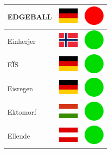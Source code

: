 \documentclass[12pt, a4paper, twoside]{report}
\begin{document}
\begin{center}
\begin{longtable}{|p{5cm}|p{2cm}|p{2cm}|}
 EDGEBALL                                                   & \includegraphics[width=1cm]{../img/flags/de} &   \includegraphics[width=1cm]{../likes/n} \\ \hline
 Einherjer                                                  & \includegraphics[width=1cm]{../img/flags/no} &   \includegraphics[width=1cm]{../likes/y} \\ \hline
 EÏS                                                        & \includegraphics[width=1cm]{../img/flags/de} &   \includegraphics[width=1cm]{../likes/y} \\ \hline
 Eisregen                                                   & \includegraphics[width=1cm]{../img/flags/de} &   \includegraphics[width=1cm]{../likes/y} \\ \hline
 Ektomorf                                                   & \includegraphics[width=1cm]{../img/flags/hu} &   \includegraphics[width=1cm]{../likes/y} \\ \hline
 Ellende                                                    & \includegraphics[width=1cm]{../img/flags/at} &   \includegraphics[width=1cm]{../likes/y} \\ \hline

\end{longtable}
\end{center}
\end{document}
